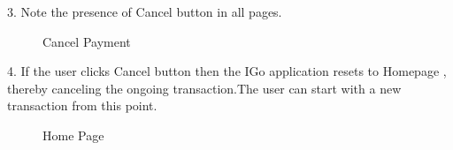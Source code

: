 \documentclass[12pt]{report}
\begin{document}
3.	Note the presence of Cancel button in all pages. \\
\begin{figure}[H]
	\caption{\label{fig:cancelpayment}Cancel Payment}	
\end{figure}


4.	If the user clicks Cancel button then the IGo application resets to Homepage , thereby canceling the ongoing transaction.The user can start with a new transaction from this point. \\
\begin{figure}[H]
	\caption{\label{fig:homepage1}Home Page}	
\end{figure}
\end{document}
